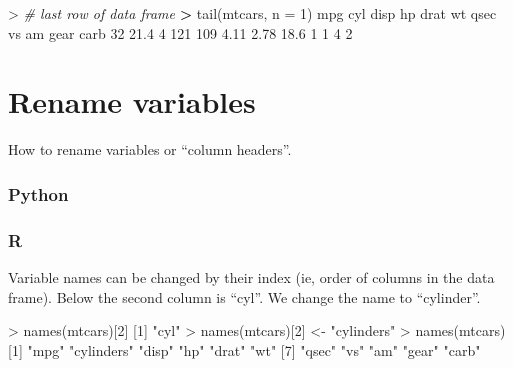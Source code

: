 \documentclass[
]{book}
\newenvironment{Shaded}{\begin{snugshade}}{\end{snugshade}}
\newcommand{\AttributeTok}[1]{\textcolor[rgb]{0.77,0.63,0.00}{#1}}
\newcommand{\CommentTok}[1]{\textcolor[rgb]{0.56,0.35,0.01}{\textit{#1}}}
\newcommand{\DecValTok}[1]{\textcolor[rgb]{0.00,0.00,0.81}{#1}}
\newcommand{\ErrorTok}[1]{\textcolor[rgb]{0.64,0.00,0.00}{\textbf{#1}}}
\newcommand{\FloatTok}[1]{\textcolor[rgb]{0.00,0.00,0.81}{#1}}
\newcommand{\FunctionTok}[1]{\textcolor[rgb]{0.00,0.00,0.00}{#1}}
\newcommand{\NormalTok}[1]{#1}
\newcommand{\OtherTok}[1]{\textcolor[rgb]{0.56,0.35,0.01}{#1}}
\newcommand{\SpecialCharTok}[1]{\textcolor[rgb]{0.00,0.00,0.00}{#1}}
\newcommand{\StringTok}[1]{\textcolor[rgb]{0.31,0.60,0.02}{#1}}
\begin{document}
\begin{Shaded}
\begin{Highlighting}[]
\SpecialCharTok{\textgreater{}} \CommentTok{\# last row of data frame}
\ErrorTok{\textgreater{}} \FunctionTok{tail}\NormalTok{(mtcars, }\AttributeTok{n =} \DecValTok{1}\NormalTok{)}
\NormalTok{    mpg cyl disp  hp drat   wt qsec vs am gear carb}
\DecValTok{32} \FloatTok{21.4}   \DecValTok{4}  \DecValTok{121} \DecValTok{109} \FloatTok{4.11} \FloatTok{2.78} \FloatTok{18.6}  \DecValTok{1}  \DecValTok{1}    \DecValTok{4}    \DecValTok{2}
\end{Highlighting}
\end{Shaded}

\hypertarget{rename-variables}{%
\section{Rename variables}\label{rename-variables}}

How to rename variables or ``column headers''.

\hypertarget{python-16}{%
\subsubsection*{Python}\label{python-16}}

\hypertarget{r-16}{%
\subsubsection*{R}\label{r-16}}

Variable names can be changed by their index (ie, order of columns in the data frame). Below the second column is ``cyl''. We change the name to ``cylinder''.

\begin{Shaded}
\begin{Highlighting}[]
\SpecialCharTok{\textgreater{}} \FunctionTok{names}\NormalTok{(mtcars)[}\DecValTok{2}\NormalTok{]}
\NormalTok{[}\DecValTok{1}\NormalTok{] }\StringTok{"cyl"}
\SpecialCharTok{\textgreater{}} \FunctionTok{names}\NormalTok{(mtcars)[}\DecValTok{2}\NormalTok{] }\OtherTok{\textless{}{-}} \StringTok{"cylinders"}
\SpecialCharTok{\textgreater{}} \FunctionTok{names}\NormalTok{(mtcars)}
\NormalTok{ [}\DecValTok{1}\NormalTok{] }\StringTok{"mpg"}       \StringTok{"cylinders"} \StringTok{"disp"}      \StringTok{"hp"}        \StringTok{"drat"}      \StringTok{"wt"}       
\NormalTok{ [}\DecValTok{7}\NormalTok{] }\StringTok{"qsec"}      \StringTok{"vs"}        \StringTok{"am"}        \StringTok{"gear"}      \StringTok{"carb"}     
\end{Highlighting}
\end{Shaded}
\end{document}
